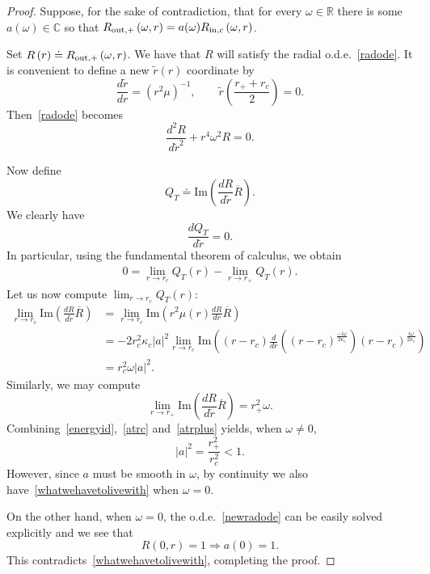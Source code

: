 \documentclass[A4,10pt]{article}
\begin{document}
\begin{proof}Suppose, for the sake of contradiction, that for every $\omega \in \mathbb{R}$ there is some $a(\omega) \in \mathbb{C}$ so that $R_{{\rm out},+}\left(\omega,r\right) = a(\omega)R_{{\rm in},c}\left(\omega,r\right)$. 

Set $R\left(r\right) \doteq R_{{\rm out},+}\left(\omega,r\right)$. We have that $R$ will satisfy the radial o.d.e.~\eqref{radode}. It is convenient to define a new $\tilde r(r)$ coordinate by
\[\frac{d\tilde r}{dr} = \left(r^2\mu\right)^{-1},\qquad \tilde r\left(\frac{r_++r_c}{2}\right) = 0.\]
Then~\eqref{radode} becomes
\begin{equation}\label{newradode}
\frac{d^2R}{d{\tilde r}^2} + r^4\omega^2 R = 0.
\end{equation}

Now define
\[Q_T \doteq \text{Im}\left(\frac{dR}{d\tilde r}\overline{R}\right).\]
We clearly have
\[\frac{dQ_T}{d\tilde r} = 0.\]
In particular, using the fundamental theorem of calculus, we obtain
\begin{align}\label{energyid}
0 = \lim_{r\to r_c}Q_T\left(r\right) - \lim_{r\to r_+}Q_T\left(r\right).
\end{align}
Let us now compute $\lim_{r\to r_c}Q_T\left(r\right)$:
\begin{align}\label{atrc}
\lim_{r\to r_c}\text{Im}\left(\frac{dR}{d\tilde r}\overline{R}\right) &= \lim_{r\to r_c} \text{Im}\left(r^2\mu(r)\frac{dR}{dr}\overline{R}\right)
\\ \nonumber &= -2r_c^2\kappa_c\left|a\right|^2\lim_{r\to r_c}\text{Im}\left((r-r_c)\frac{d}{dr}\left(\left(r-r_c\right)^{\frac{-i\omega}{2\kappa_c}}\right)\left(r-r_c\right)^{\frac{i\omega}{2\kappa_c}}\right)
\\ \nonumber &= r_c^2\omega\left|a\right|^2.
\end{align}
Similarly, we may compute
\begin{equation}\label{atrplus}
\lim_{r\to r_+}\text{Im}\left(\frac{dR}{d\tilde r}\overline{R}\right)  = r_+^2\omega.
\end{equation}
Combining~\eqref{energyid},~\eqref{atrc} and~\eqref{atrplus} yields, when $\omega \neq 0$,
\begin{equation}\label{whatwehavetolivewith}
\left|a\right|^2 = \frac{r_+^2}{r_c^2} < 1.
\end{equation}
However, since $a$ must be smooth in $\omega$, by continuity we also have~\eqref{whatwehavetolivewith} when $\omega = 0$.

On the other hand, when $\omega = 0$, the o.d.e.~\eqref{newradode} can be easily solved explicitly and we see that
\[R\left(0,r\right) = 1 \Rightarrow a(0) = 1.\]
This contradicts~\eqref{whatwehavetolivewith}, completing the proof.



\end{proof}
\end{document}
